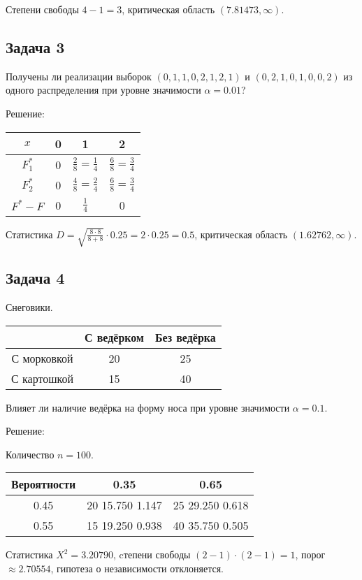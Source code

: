 \documentclass[a4paper,12pt]{article}
\begin{document}
Степени свободы $4-1=3$, критическая область $(7.81473, \infty)$.

\subsection*{Задача 3}

Получены ли реализации выборок $(0, 1, 1, 0, 2, 1, 2, 1)$ и $(0, 2, 1, 0, 1, 0, 0, 2)$ из одного распределения при уровне значимости $\alpha = 0.01$?

Решение:

\begin{tabular}{|c|c|c|c|}
    \hline
    $x$       & 0 & 1                           & 2                           \\
    \hline
    $F_1^*$   & 0 & $\frac{2}{8} = \frac{1}{4}$ & $\frac{6}{8} = \frac{3}{4}$ \\
    \hline
    $F_2^*$   & 0 & $\frac{4}{8} = \frac{2}{4}$ & $\frac{6}{8} = \frac{3}{4}$ \\
    \hline
    $F^* - F$ & 0 & $\frac{1}{4}$               & 0                           \\
    \hline
\end{tabular}

Статистика $D = \sqrt{\frac{8 \cdot 8}{8 + 8}} \cdot 0.25 = 2 \cdot 0.25 = 0.5$, критическая область $(1.62762, \infty)$.


\subsection*{Задача 4}

Снеговики.

\begin{tabular}{|c|c|c|}
    \hline
                & С ведёрком & Без ведёрка \\
    \hline
    С морковкой & 20         & 25          \\
    \hline
    С картошкой & 15         & 40          \\
    \hline
\end{tabular}

Влияет ли наличие ведёрка на форму носа при уровне значимости $\alpha=0.1$.

Решение:

Количество $n=100$.

\begin{tabular}{|c|c|c|}
    \hline
    Вероятности & 0.35            & 0.65            \\
    \hline
    0.45        & 20 15.750 1.147 & 25 29.250 0.618 \\
    \hline
    0.55        & 15 19.250 0.938 & 40 35.750 0.505 \\
    \hline
\end{tabular}

Статистика $X^2 = 3.20790$, cтепени свободы $(2-1) \cdot (2-1) = 1$, порог $\approx 2.70554$, гипотеза о независимости отклоняется.
\end{document}
